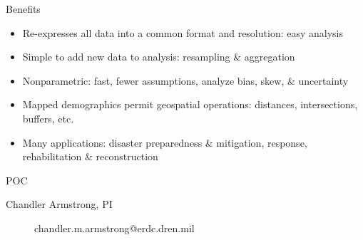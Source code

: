 \documentclass{beamer}
\begin{document}
\begin{frame}{Benefits}
  \begin{itemize}
  \item Re-expresses all data into a common format and resolution: easy analysis
  \item Simple to add new data to analysis: resampling \& aggregation
  \item Nonparametric: fast, fewer assumptions, analyze bias, skew, \& uncertainty
  \item Mapped demographics permit geospatial operations: distances, intersections, buffers, etc.
  \item Many applications: disaster preparedness \& mitigation, response, rehabilitation \& reconstruction
  \end{itemize}
\end{frame}





\begin{frame}{POC}
\begin{description}
  \item[Chandler Armstrong, PI] chandler.m.armstrong@erdc.dren.mil
\end{description}
\end{frame}
\end{document}
